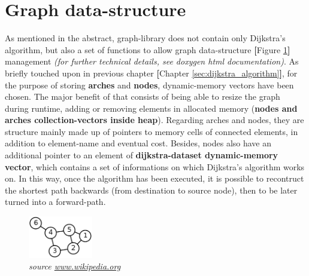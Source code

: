 \documentclass{article}                                                                                                     %
\begin{document}
\section{Graph data-structure}                                                                                              %
\label{sec:graph_data_structure}                                                                                            %
  As mentioned in the abstract, graph-library does not contain only Dijkstra’s algorithm, but also a set of functions       %
  to allow graph data-structure \textbf{[}Figure \ref{fig:graph}\textbf{]} management \textit{(for further technical
  details, see doxygen html documentation)}. As briefly touched upon in previous chapter
  \textbf{[}Chapter \ref{sec:dijkstra_algorithm}\textbf{]}, for the purpose of storing \textbf{arches} and \textbf{nodes},
  dynamic-memory vectors have been chosen. The major benefit of that consists of being able to resize the graph during
  runtime, adding or removing elements in allocated memory (\textbf{nodes and arches collection-vectors inside heap}).
  Regarding arches and nodes, they are structure mainly made up of pointers to memory cells of connected elements, in
  addition to element-name and eventual cost. Besides, nodes also have an additional pointer to an element of
  \textbf{dijkstra-dataset dynamic-memory vector}, which contains a set of informations on which Dijkstra's algorithm
  works on. In this way, once the algorithm has been executed, it is possible to recontruct the shortest path backwards
  (from destination to source node), then to be later turned into a forward-path.
  \begin{figure}[ht!]                                                                                                       %
    \centering                                                                                                              %
    \includegraphics[width=0.25\textwidth]{imgs/graph.png}                                                                  %
    \caption{\textit{source \href{https://en.wikipedia.org/wiki/Graph_theory}{www.wikipedia.org}}}                          %
    \label{fig:graph}                                                                                                       %
  \end{figure}                                                                                                              %
\end{document}
